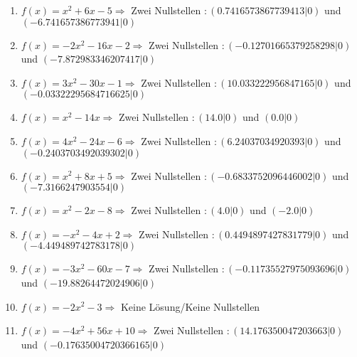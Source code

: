 \documentclass{article}%
\begin{document}
\begin{enumerate}[label=\alph*)]
\item%
\newline\vspace{0.5cm}$f(x)=x^2 + 6x - 5 \Rightarrow $ Zwei Nullstellen $: (0.7416573867739413|0) $ und $ (-6.741657386773941|0) $%
\item%
\newline\vspace{0.5cm}$f(x)=-2x^2 - 16x - 2 \Rightarrow $ Zwei Nullstellen $: (-0.12701665379258298|0) $ und $ (-7.872983346207417|0) $%
\item%
\newline\vspace{0.5cm}$f(x)=3x^2 - 30x - 1 \Rightarrow $ Zwei Nullstellen $: (10.033222956847165|0) $ und $ (-0.03322295684716625|0) $%
\item%
\newline\vspace{0.5cm}$f(x)=x^2 - 14x \Rightarrow $ Zwei Nullstellen $: (14.0|0) $ und $ (0.0|0) $%
\item%
\newline\vspace{0.5cm}$f(x)=4x^2 - 24x - 6 \Rightarrow $ Zwei Nullstellen $: (6.24037034920393|0) $ und $ (-0.2403703492039302|0) $%
\item%
\newline\vspace{0.5cm}$f(x)=x^2 + 8x + 5 \Rightarrow $ Zwei Nullstellen $: (-0.6833752096446002|0) $ und $ (-7.3166247903554|0) $%
\item%
\newline\vspace{0.5cm}$f(x)=x^2 - 2x - 8 \Rightarrow $ Zwei Nullstellen $: (4.0|0) $ und $ (-2.0|0) $%
\item%
\newline\vspace{0.5cm}$f(x)=-x^2 - 4x + 2 \Rightarrow $ Zwei Nullstellen $: (0.4494897427831779|0) $ und $ (-4.449489742783178|0) $%
\item%
\newline\vspace{0.5cm}$f(x)=-3x^2 - 60x - 7 \Rightarrow $ Zwei Nullstellen $: (-0.11735527975093696|0) $ und $ (-19.88264472024906|0) $%
\item%
\newline\vspace{0.5cm}$f(x)=-2x^2 - 3 \Rightarrow  $ Keine Lösung/Keine Nullstellen $ $%
\item%
\newline\vspace{0.5cm}$f(x)=-4x^2 + 56x + 10 \Rightarrow $ Zwei Nullstellen $: (14.176350047203663|0) $ und $ (-0.17635004720366165|0) $%

\end{enumerate}
\end{document}
